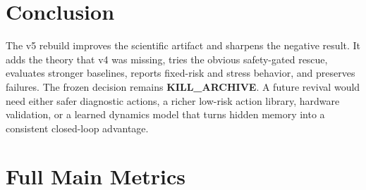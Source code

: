 \documentclass{article}
\begin{document}
\section{Conclusion}
The v5 rebuild improves the scientific artifact and sharpens the negative result. It adds the theory that v4 was missing, tries the obvious safety-gated rescue, evaluates stronger baselines, reports fixed-risk and stress behavior, and preserves failures. The frozen decision remains \textbf{KILL\_ARCHIVE}. A future revival would need either safer diagnostic actions, a richer low-risk action library, hardware validation, or a learned dynamics model that turns hidden memory into a consistent closed-loop advantage.

\clearpage
\appendix
\section{Full Main Metrics}
\scriptsize
\setlength{\tabcolsep}{2pt}
\end{document}
